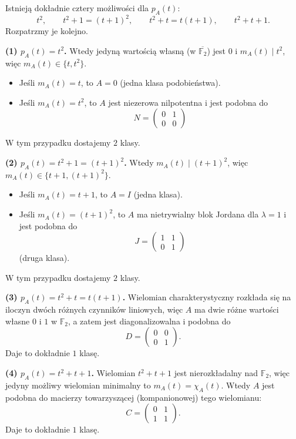 \documentclass{../notatki}
\begin{document}
Istnieją dokładnie cztery możliwości dla $p_A(t)$:
$$
t^2,\qquad t^2+1=(t+1)^2,\qquad t^2+t=t(t+1),\qquad t^2+t+1.
$$
Rozpatrzmy je kolejno.

\noindent\textbf{(1) $p_A(t)=t^2$.}
Wtedy jedyną wartością własną (w $\overline{\mathbb{F}_2}$) jest $0$ i
$m_A(t)\mid t^2$, więc $m_A(t)\in\{t,t^2\}$.
\begin{itemize}
  \item Jeśli $m_A(t)=t$, to $A=0$ (jedna klasa podobieństwa).
  \item Jeśli $m_A(t)=t^2$, to $A$ jest niezerowa nilpotentna i jest podobna do
    $$
    N =
    \begin{pmatrix}
      0 & 1 \\
      0 & 0
    \end{pmatrix}
    $$
\end{itemize}
W tym przypadku dostajemy $2$ klasy.

\noindent\textbf{(2) $p_A(t)=t^2+1=(t+1)^2$.}
Wtedy $m_A(t)\mid (t+1)^2$, więc $m_A(t)\in\{t+1,(t+1)^2\}$.
\begin{itemize}
  \item Jeśli $m_A(t)=t+1$, to $A=I$ (jedna klasa).
  \item Jeśli $m_A(t)=(t+1)^2$, to $A$ ma nietrywialny blok Jordana dla
    $\lambda=1$ i jest podobna do
    $$
    J =
    \begin{pmatrix}
      1 & 1 \\
      0 & 1
    \end{pmatrix}
    $$
    (druga klasa).
\end{itemize}
W tym przypadku dostajemy $2$ klasy.

\noindent\textbf{(3) $p_A(t)=t^2+t=t(t+1)$.}
Wielomian charakterystyczny rozkłada się na iloczyn dwóch różnych czynników
liniowych, więc $A$ ma dwie różne wartości własne $0$ i $1$ w $\mathbb{F}_2$,
a zatem jest diagonalizowalna i podobna do
$$
D =
\begin{pmatrix}
  0 & 0 \\
  0 & 1
\end{pmatrix}.
$$
Daje to dokładnie $1$ klasę.

\noindent\textbf{(4) $p_A(t)=t^2+t+1$.}
Wielomian $t^2+t+1$ jest nierozkładalny nad $\mathbb{F}_2$, więc jedyny
możliwy wielomian minimalny to $m_A(t)=\chi_A(t)$.
Wtedy $A$ jest podobna do macierzy towarzyszącej (kompanionowej) tego
wielomianu:
$$
C =
\begin{pmatrix}
  0 & 1 \\
  1 & 1
\end{pmatrix}.
$$
Daje to dokładnie $1$ klasę.
\end{document}
